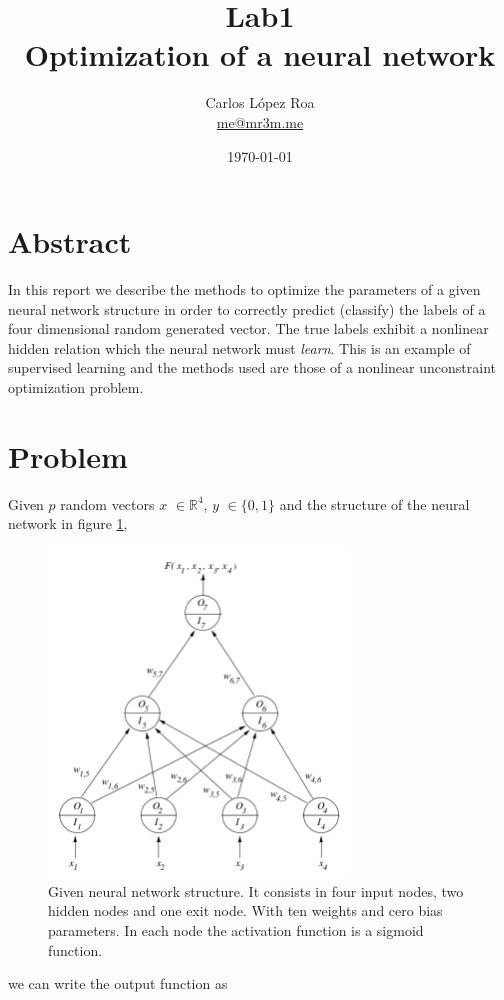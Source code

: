 \documentclass[a4paper,10pt,twocolumn]{article}
\title{Lab1 \\ Optimization of a neural network}
\author{Carlos López Roa\\ \href{mailto:me@mr3m.me}{me@mr3m.me}}
\date{\today}
\begin{document}
\maketitle
\section*{Abstract}
In this report we describe the methods to optimize the parameters of a given neural network structure in order to correctly predict (classify) the labels of a four dimensional random generated vector. The true labels exhibit a nonlinear hidden relation which the neural network must \emph{learn}. This is an example of supervised learning and the methods used are those of a nonlinear unconstraint optimization problem.

\section{Problem}
Given $p$ random vectors $x$ $\in \mathbb{R}^4$, $y$ $\in \{0,1\}$ and the structure of the neural network in figure \ref{neural}, 

\begin{figure}[!ht]
\begin{center}
\includegraphics[width=8cm]{neural.png}
\caption{Given neural network structure. It consists in four input nodes, two hidden nodes and one exit node. With ten weights and cero bias parameters. In each node the activation function is a sigmoid function.\label{neural}}
\end{center}
\end{figure}

we can write the output function as
\end{document}
